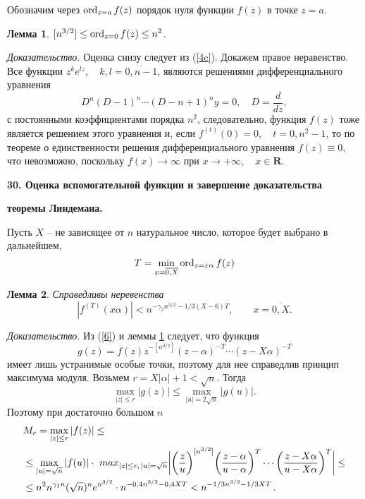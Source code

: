 \documentclass[12pt]{article}
\newtheorem{lemma}{Лемма}
\let\ol\overline
\begin{document}
Обозначим через $\operatorname{ord}_{z=a}f(z)$  порядок нуля функции $f(z)$  в
точке $z=a$.

\begin{lemma}\label{M}  $[n^{3/2}] \leq \operatorname{ord}_{z=0}f(z) \leq n^2$.
\end{lemma}

 \emph{Доказательство.}   Оценка снизу следует из (\ref{4c}).
Докажем правое неравенство.  Все функции $z^ke^{lz}, \quad k,l=
\ol{0,n-1}$, являются решениями дифференциального уравнения
$$
D^n(D-1)^n \cdots (D-n+1)^ny=0, \quad D=\frac d{dz},
$$
с постоянными коэффициентами порядка $n^2$, следовательно, функция
$f(z)$ тоже является решением этого уравнения и, если
$f^{(t)}(0)=0, \quad t=\ol{0,n^2-1}$, то по теореме о
единственности решения дифференциального уравнения  $f(z) \equiv
0$, что невозможно, поскольку $f(x) \to \infty$ при $x\to +\infty,
\quad x\in\mathbf  R$.



\vskip 5mm \centerline{\bf {30. Оценка
вспомогательной функции и завершение
доказательства}  } \centerline{\bf {теоремы
Линдемана.}}
 \vskip 5mm

Пусть $X$  -- не зависящее от $n$ натуральное число, которое будет
выбрано в дальнейшем,
\begin{equation}\label{6}
T=\min_{x=\ol{0,X}}\ord_{z=x \alpha}f(z)
\end{equation}
\begin{lemma}\label{N}  Справедливы неревенства
$$
|f^{(T)}(x \alpha)| < n^{-\gamma_2n^{3/2}-1/3(X-6)T}, \qquad
x=\ol{0,X}.
$$
\end{lemma}

\emph{Доказательство.}  Из (\ref{6}) и леммы
\ref{M} следует, что функция
$$
g(z)=f(z)z^{-[n^{3/2}]}(z-\alpha)^{-T} \cdots (z-X\alpha)^{-T}
$$
имеет лишь устранимые особые точки, поэтому для нее справедлив
принцип максимума модуля. Возьмем $r=X|\alpha |+1<\sqrt n$. Тогда
$$
\max_{|z| \le r}|g(z)| \le \max_{|u|=2\sqrt n}|g(u)|.
$$
Поэтому   при достаточно большом $n$
\begin{equation}\label{7}
\aligned &
M_r=\max_{|z| \le r}|f(z)| \le  \\
& \le\max_{|u|=\sqrt n}|f(u)| \cdot \ max_{|z|
\le r,\,  |u|=\sqrt n} \biggl|\biggl(\frac zu
\biggr)^{[n^{3/2}]}
\biggl(\frac{z-\alpha}{u-\alpha}\biggr)^T \cdots
\biggl(\frac{z-X\alpha}{u-X\alpha}\biggr)^T
\biggr| \le \\
 & \le n^2n^{\gamma_1n}(\sqrt n)^n
e^{n^{3/2}}\cdot
 n^{-0,4n^{3/2}-0,4XT}<n^{-1/3n^{3/2}-1/3XT}\,.
\endaligned
\end{equation}
\end{document}
